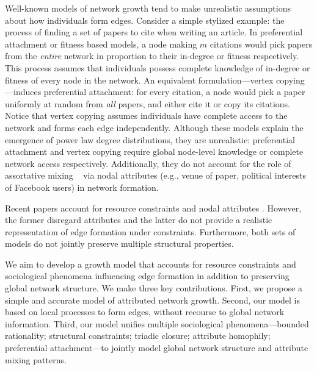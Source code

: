Well-known models of network growth tend to make unrealistic assumptions about how
individuals form edges. Consider a simple stylized example: the process of
finding a set of papers to cite when writing an article. In preferential
attachment \cite{barabasi1999emergence} or fitness
\cite{bianconi2001bose,caldarelli2002scale,wang2013quantifying} based models, a
node making $m$ citations would pick papers from the \textit{entire} network in
proportion to their in-degree or fitness respectively. This process assumes that
individuals possess {complete} knowledge of in-degree or fitness of every node
in the network. An equivalent formulation---vertex copying
\cite{kumar2000stochastic}---induces preferential attachment: for every
citation, a node would pick a paper uniformly at random from \textit{all}
papers, and either cite it or copy its citations. Notice that vertex copying assumes individuals have complete access to the network and forms each
edge independently. Although these models explain the emergence of power law
degree distributions, they are unrealistic: preferential attachment and vertex
copying require global node-level knowledge or complete network access respectively.
Additionally, they do not account for the role of assortative mixing ~\cite{newman2002assortative} via nodal attributes (e.g., venue of paper, political interests of Facebook users) in network formation.

Recent papers account for resource constraints
\cite{mossa2002truncation,zeng2005construction,wang2009local} and nodal
attributes \cite{de2013scale,gong2012evolution}. However, the former disregard
attributes and the latter do not provide a realistic representation of edge
formation under constraints. Furthermore, both sets of models do not
jointly preserve multiple structural properties.

We aim to develop a growth model that accounts for resource constraints and sociological phenomena
influencing edge formation in addition to preserving global network structure.
We make three key contributions.
First, we propose a simple and accurate model of attributed network growth.
Second, our model is based on local processes to form edges, without recourse to global network information.
Third, our model unifies multiple sociological phenomena---bounded rationality; structural constraints; triadic closure; attribute homophily; preferential attachment---to jointly  model global network structure and attribute mixing patterns.

